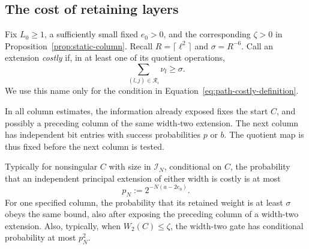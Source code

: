 \subsection{The cost of retaining layers}

Fix \(L_0\ge1\), a sufficiently small fixed \(e_0>0\), and the
corresponding \(\zeta>0\) in Proposition~\ref{prop:static-column}.
Recall \(R=\lceil\ell^2\rceil\) and \(\sigma=R^{-6}\).
Call an extension \emph{costly} if, in at least one of its quotient
operations,
\begin{equation}\label{eq:path-costly-definition}
 \sum_{(l,j)\in\mathcal R_i}\nu_l\ge\sigma.
\end{equation}
We use this name only for the condition in
Equation~\eqref{eq:path-costly-definition}.

In all column estimates, the information already exposed fixes the
start \(C\), and possibly a preceding column of the same width-two
extension. The next column has independent bit entries with success
probabilities \(p\) or \(b\). The quotient map is thus fixed before
the next column is tested.

\begin{lemma}\label{lem:path-retention-cost}
Typically for nonsingular \(C\) with size in \(\mathcal I_N\),
conditional on \(C\), the probability that an independent principal
extension of either width is costly is at most
\begin{equation}\label{eq:path-retention-cost}
 p_N:=2^{-N(a-2e_0)}.
\end{equation}
For one specified column, the probability that its retained weight
is at least \(\sigma\) obeys the same bound, also after exposing the
preceding column of a width-two extension. Also, typically, when
\(W_2(C)\le\zeta\), the width-two gate has conditional probability
at most \(p_N^2\).
\end{lemma}

